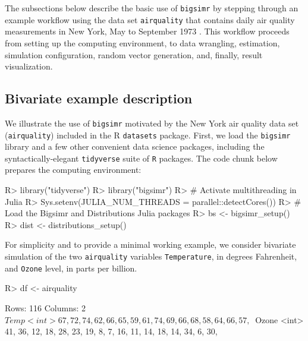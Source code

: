\documentclass[
]{jss}
\begin{document}
The subsections below describe the basic use of \texttt{bigsimr} by
stepping through an example workflow using the data set
\texttt{airquality} that contains daily air quality measurements in New
York, May to September 1973 \citep{Chambers1983}. This workflow proceeds
from setting up the computing environment, to data wrangling,
estimation, simulation configuration, random vector generation, and,
finally, result visualization.

\hypertarget{bivariate-example-description}{%
\subsection{Bivariate example
description}\label{bivariate-example-description}}

We illustrate the use of \texttt{bigsimr} motivated by the New York air
quality data set (\texttt{airquality}) included in the R
\texttt{datasets} package. First, we load the \texttt{bigsimr} library
and a few other convenient data science packages, including the
syntactically-elegant \texttt{tidyverse} suite of \texttt{R} packages.
The code chunk below prepares the computing environment:

\begin{CodeChunk}
\begin{CodeInput}
R> library("tidyverse")
R> library("bigsimr")
R> # Activate multithreading in Julia
R> Sys.setenv(JULIA_NUM_THREADS = parallel::detectCores())
R> # Load the Bigsimr and Distributions Julia packages
R> bs <- bigsimr_setup()
R> dist <- distributions_setup()
\end{CodeInput}
\end{CodeChunk}

For simplicity and to provide a minimal working example, we consider
bivariate simulation of the two \texttt{airquality} variables
\texttt{Temperature}, in degrees Fahrenheit, and \texttt{Ozone} level,
in parts per billion.

\begin{CodeChunk}
\begin{CodeInput}
R> df <- airquality %
\end{CodeInput}
\end{CodeChunk}

\begin{CodeChunk}
\begin{CodeOutput}
Rows: 116
Columns: 2
$ Temp  <int> 67, 72, 74, 62, 66, 65, 59, 61, 74, 69, 66, 68, 58, 64, 66, 57, ~
$ Ozone <int> 41, 36, 12, 18, 28, 23, 19, 8, 7, 16, 11, 14, 18, 14, 34, 6, 30,~
\end{CodeOutput}
\end{CodeChunk}
\end{document}
